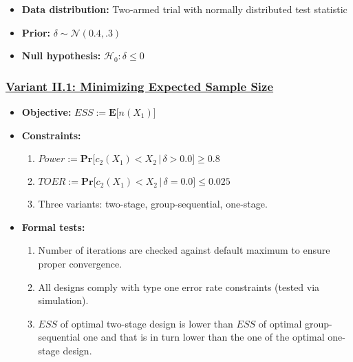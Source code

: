 \documentclass[]{book}
\providecommand{\tightlist}{%
  \setlength{\itemsep}{0pt}\setlength{\parskip}{0pt}}
\begin{document}
\begin{itemize}
\tightlist
\item
  \textbf{Data distribution:} Two-armed trial with normally distributed test statistic
\item
  \textbf{Prior:} \(\delta\sim\mathcal{N}(0.4, .3)\)
\item
  \textbf{Null hypothesis:} \(\mathcal{H}_0:\delta \leq 0\)
\end{itemize}

\hypertarget{variant-ii.1-minimizing-expected-sample-size}{%
\subsubsection{\texorpdfstring{\protect\hyperlink{variantII_1}{Variant II.1: Minimizing Expected Sample Size}}{Variant II.1: Minimizing Expected Sample Size}}\label{variant-ii.1-minimizing-expected-sample-size}}

\begin{itemize}
\tightlist
\item
  \textbf{Objective:} \(ESS := \boldsymbol{E}\big[n(X_1)\big]\)
\item
  \textbf{Constraints:}

  \begin{enumerate}
  \def\labelenumi{\arabic{enumi}.}
  \tightlist
  \item
    \(Power := \boldsymbol{Pr}\big[c_2(X_1) < X_2\,|\,\delta> 0.0\big] \geq 0.8\)
  \item
    \(TOER := \boldsymbol{Pr}\big[c_2(X_1) < X_2\,|\,\delta=0.0\big] \leq 0.025\)
  \item
    Three variants: two-stage, group-sequential, one-stage.
  \end{enumerate}
\item
  \textbf{Formal tests:}

  \begin{enumerate}
  \def\labelenumi{\arabic{enumi}.}
  \tightlist
  \item
    Number of iterations are checked against default maximum to ensure proper
    convergence.
  \item
    All designs comply with type one error rate constraints (tested via
    simulation).
  \item
    \(ESS\) of optimal two-stage design is lower than \(ESS\) of optimal
    group-sequential one and that is in turn lower than the one of the
    optimal one-stage design.
  \end{enumerate}
\end{itemize}
\end{document}
